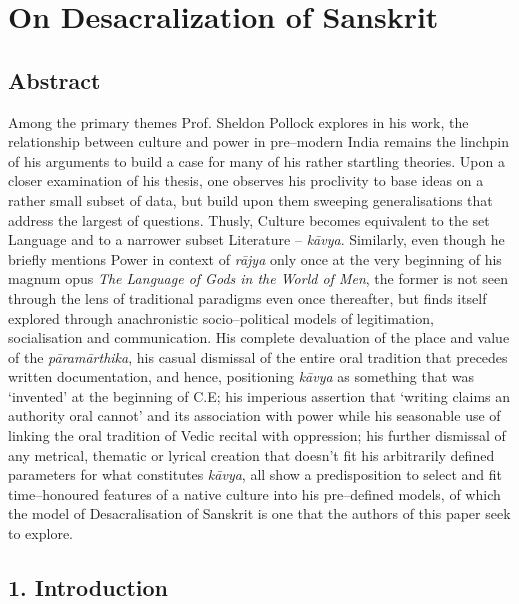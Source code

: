 
\chapter{On Desacralization of Sanskrit}\label{chapter8}



\section*{Abstract}

Among the primary themes Prof. Sheldon Pollock explores in his work, the relationship between culture and power in pre–modern India remains the linchpin of his arguments to build a case for many of his rather startling theories. Upon a closer examination of his thesis, one observes his proclivity to base ideas on a rather small subset of data, but build upon them sweeping generalisations that address the largest of questions. Thusly, Culture becomes equivalent to the set Language and to a narrower subset Literature – \textit{kāvya}. Similarly, even though he briefly mentions Power in context of \textit{rājya} only once at the very beginning of his magnum opus \textit{The Language of Gods in the World of Men}, the former is not seen through the lens of traditional paradigms even once thereafter, but finds itself explored through anachronistic socio–political models of legitimation, socialisation and communication. His complete devaluation of the place and value of the \textit{pāramārthika}, his casual dismissal of the entire oral tradition that precedes written documentation, and hence, positioning \textit{kāvya} as something that was ‘invented’ at the beginning of C.E; his imperious assertion that ‘writing claims an authority oral cannot’ and its association with power while his seasonable use of linking the oral tradition of Vedic recital with oppression; his further dismissal of any metrical, thematic or lyrical creation that doesn’t fit his arbitrarily defined parameters for what constitutes \textit{kāvya}, all show a predisposition to select and fit time–honoured features of a native culture into his pre–defined models, of which the model of Desacralisation of Sanskrit is one that the authors of this paper seek to explore.


\section*{1. Introduction}

